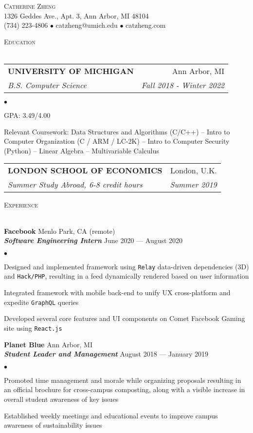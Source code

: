 \documentclass{article}
\makeatletter
\newcommand{\lineunder}{\vspace*{-8pt} \\ \hspace*{-20pt} \hrulefill \\}
\newcommand{\header}[1]{{\hspace*{-20pt}\vspace*{6pt} \large\textsc{#1}} \vspace*{-5pt} \lineunder \vspace{3pt}}
\newcommand{\employer}[4]{{ \normalsize\textbf{#1} \small\hfill{#2}\\ {\small\textbf{\emph{#3}}} \small\hfill{#4}\\ }}
\newcommand{\contact}[3]{
\vspace*{-5pt}
\begin{center}
{\huge \scshape {#1}}\\
\vspace{2pt}
#2\\
#3
\end{center}
\vspace*{-10pt}
}
\newenvironment{achievements}{\begin{list}{$\bullet$}{\topsep 0pt \itemsep 0pt}}{\vspace*{5pt}\end{list}}
\newcommand{\school}[4]{
\begin{tabular*}{6.55in}{l@{\extracolsep{\fill}}r}
	\uppercase{\normalsize\textbf{#1}} & #2 \\
	\textit{#3} & \textit{#4}\\
\end{tabular*}\vspace*{3pt}}
\makeatother
\begin{document}
\small
\smallskip
\vspace*{-40pt}

\contact{Catherine Zheng}
{\small1326 Geddes Ave., Apt. 3, Ann Arbor, MI 48104}
{\small(734) 223-4806 $\bullet$ catzheng@umich.edu  $\bullet$ catzheng.com}

\vspace{10pt}
\header{Education}

\vspace{1ex}
\school{University of Michigan}{Ann Arbor, MI}{B.S. Computer Science}{Fall 2018 - Winter 2022}
\begin{achievements}
\item GPA: 3.49/4.00
\item Relevant Coursework: Data Structures and Algorithms (C/C++) -- Intro to Computer Organization (C / ARM / LC-2K) -- Intro to Computer Security (Python) -- Linear Algebra -- Multivariable Calculus
\end{achievements}
\vspace{1pt}
\school{London School of Economics}{London, U.K.}{Summer Study Abroad, 6-8 credit hours}{Summer 2019}
\vspace{1pt}

\header{Experience}

\employer{Facebook}{Menlo Park, CA (remote)}{Software Engineering Intern}{June 2020 --- August 2020}
	\begin{achievements}
    \item Designed and implemented framework using \texttt{Relay} data-driven dependencies (3D) and \texttt{Hack/PHP}, resulting in a feed dynamically rendered based on user information
    \item Integrated framework with mobile back-end to unify UX cross-platform and expedite \texttt{GraphQL} queries
	\item Developed several core features and UI components on Comet Facebook Gaming site using \texttt{React.js}
	\end{achievements}

\employer{Planet Blue}{Ann Arbor, MI}{Student Leader and Management}{August 2018 --- January 2019}
	\begin{achievements}
	\item Promoted time management and morale while organizing proposals resulting in an official brochure for cross-campus composting, along with a visible increase in overall student awareness of key issues
	\item Established weekly meetings and educational events to improve campus awareness of sustainability issues
	\end{achievements}
\end{document}
